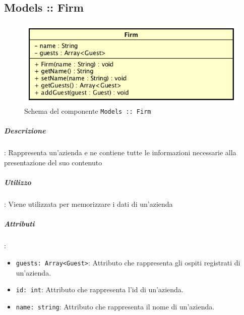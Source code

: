 \documentclass[../ManualeSviluppatore_v2.0.0.tex]{subfiles}
\begin{document}
\newpage
	\subsection{Models :: Firm}
	\begin{figure}[!h]
		\centering
		\includegraphics[scale=0.6]{Architettura/Front-End/Models/Firm.png}
		\caption{Schema del componente \texttt{Models :: Firm}}
	\end{figure}

		
		\subparagraph{Descrizione}: Rappresenta un'azienda e ne contiene tutte le informazioni necessarie alla presentazione del suo contenuto
		
		\subparagraph{Utilizzo}: Viene utilizzata per memorizzare i dati di un'azienda
		
		\subparagraph{Attributi}:
		      \begin{itemize}
		      	\item \texttt{guests: Array<Guest>}:
		      	      Attributo che rappresenta gli ospiti registrati di un'azienda.
		      	\item \texttt{id: int}:
		      	      Attributo che rappresenta l'id di un'azienda.
		      	\item \texttt{name: string}:
		      	      Attributo che rappresenta il nome di un'azienda.
		      \end{itemize}
		
\end{document}
